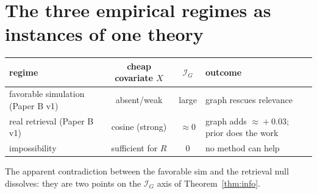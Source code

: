 \documentclass[11pt]{article}
\begin{document}
\section{The three empirical regimes as instances of one theory}\label{sec:regimes}
\begin{center}\small
\begin{tabular}{lccl}
\toprule
regime & cheap covariate $X$ & $\mathcal I_G$ & outcome \\ \midrule
favorable simulation (Paper B v1) & absent/weak & large & graph rescues relevance \\
real retrieval (Paper B v1) & cosine (strong) & $\approx 0$ & graph adds $\approx\!+0.03$; prior does the work \\
impossibility & sufficient for $R$ & $0$ & no method can help \\ \bottomrule
\end{tabular}
\end{center}
The apparent contradiction between the favorable sim and the retrieval null dissolves: they are two points on the
$\mathcal I_G$ axis of Theorem~\ref{thm:info}.
\end{document}
